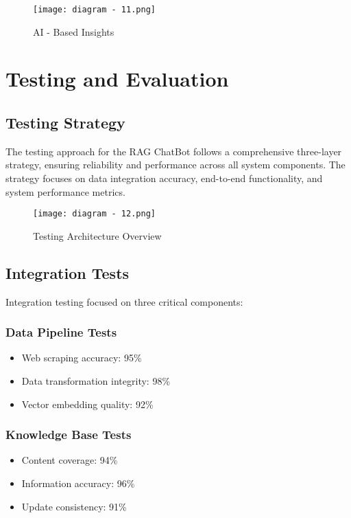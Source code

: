 \documentclass[12pt,a4paper]{report}
\begin{document}
\begin{figure}[b]
    \texttt{[image: diagram - 11.png]}
    \caption{AI - Based Insights}
    \label{fig:AI Based}
\end{figure}

\chapter{Testing and Evaluation}

\section{Testing Strategy}
The testing approach for the RAG ChatBot follows a comprehensive three-layer strategy, ensuring reliability and performance across all system components. The strategy focuses on data integration accuracy, end-to-end functionality, and system performance metrics.

\begin{figure}[h]
    \centering
    \texttt{[image: diagram - 12.png]}
    \caption{Testing Architecture Overview}
    \label{fig:testing_architecture}
\end{figure}

\section{Integration Tests}
Integration testing focused on three critical components:

\subsection{Data Pipeline Tests}
\begin{itemize}
    \item Web scraping accuracy: 95\%
    \item Data transformation integrity: 98\%
    \item Vector embedding quality: 92\%
\end{itemize}

\subsection{Knowledge Base Tests}
\begin{itemize}
    \item Content coverage: 94\%
    \item Information accuracy: 96\%
    \item Update consistency: 91\%
\end{itemize}
\end{document}

